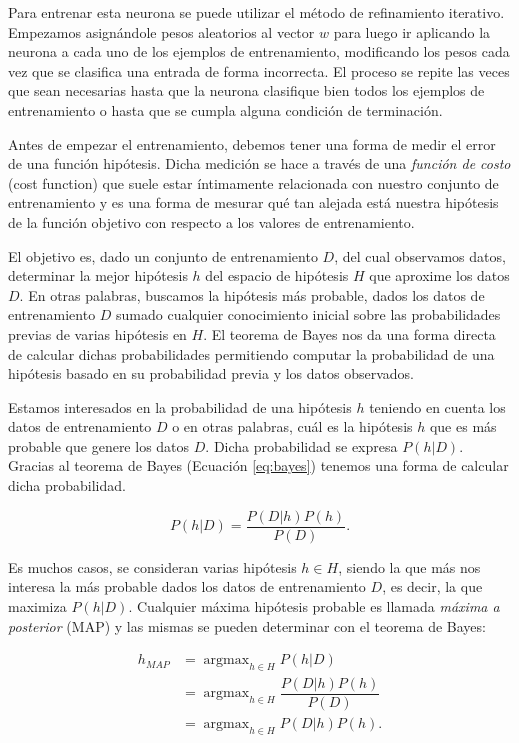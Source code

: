 \documentclass[spanish]{report}
\DeclareMathOperator*{\argmax}{argmax} %
\begin{document}
Para entrenar esta neurona se puede utilizar el método de refinamiento iterativo. Empezamos asignándole pesos aleatorios al vector $w$ para luego ir aplicando la neurona a cada uno de los ejemplos de entrenamiento, modificando los pesos cada vez que se clasifica una entrada de forma incorrecta. El proceso se repite las veces que sean necesarias hasta que la neurona clasifique bien todos los ejemplos de entrenamiento o hasta que se cumpla alguna condición de terminación. 


Antes de empezar el entrenamiento, debemos tener una forma de medir el error de una función hipótesis. Dicha medición se hace a través de una \textit{función de costo} (cost function) que suele estar íntimamente relacionada con nuestro conjunto de entrenamiento y es una forma de mesurar qué tan alejada está nuestra hipótesis de la función objetivo con respecto a los valores de entrenamiento. 

El objetivo es, dado un conjunto de entrenamiento $D$, del cual observamos datos, determinar la mejor hipótesis $h$ del espacio de hipótesis $H$ que aproxime los datos $D$. En otras palabras, buscamos la hipótesis más probable, dados los datos de entrenamiento $D$ sumado cualquier conocimiento inicial sobre las probabilidades previas de varias hipótesis en $H$. El teorema de Bayes nos da una forma directa de calcular dichas probabilidades permitiendo computar la probabilidad de una hipótesis basado en su probabilidad previa y los datos observados.

Estamos interesados en la probabilidad de una hipótesis $h$ teniendo en cuenta los datos de entrenamiento $D$ o en otras palabras, cuál es la hipótesis $h$ que es más probable que genere los datos $D$. Dicha probabilidad se expresa $P(h|D)$. Gracias al teorema de Bayes (Ecuación \ref{eq:bayes}) tenemos una forma de calcular dicha probabilidad.


\begin{equation}\label{eq:bayes}
P(h|D) = \dfrac{P(D|h)P(h)}{P(D)}.
\end{equation}

\noindent Es muchos casos, se consideran varias hipótesis $h \in H$, siendo la que más nos interesa la más probable dados los datos de entrenamiento $D$, es decir, la que maximiza $P(h|D)$. Cualquier máxima hipótesis probable es llamada \textit{máxima a posterior} (MAP) y las mismas se pueden determinar con el teorema de Bayes:

\begin{equation}\label{eq:bayes_posteriori}
\begin{split}
h_{MAP} & = \argmax_{h \in H}{P(h|D)}\\
 & = \argmax_{h \in H}{\dfrac{P(D|h)P(h)}{P(D)}}\\
& = \argmax_{h \in H}{P(D|h)P(h)}.
\end{split}
\end{equation}
\end{document}
